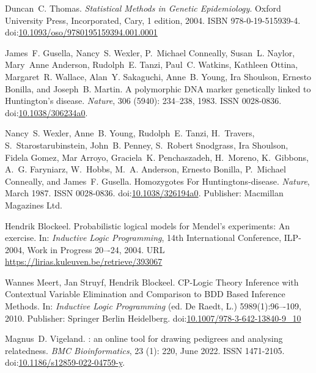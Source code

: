 \documentclass{eptcs}
\providecommand{\urlalt}[2]{\href{#1}{#2}}
\providecommand{\doi}[1]{doi:\urlalt{http://dx.doi.org/#1}{#1}}
\begin{document}
\begin{thebibliography}{}
Duncan~C. Thomas.
\newblock \emph{Statistical {Methods} in {Genetic} {Epidemiology}}.
\newblock Oxford University Press, Incorporated, Cary, 1 edition, 2004.
\newblock ISBN 978-0-19-515939-4.
\newblock \doi{10.1093/oso/9780195159394.001.0001}

James~F. Gusella, Nancy~S. Wexler, P.~Michael Conneally, Susan~L. Naylor, Mary~Anne Anderson, Rudolph~E. Tanzi, Paul~C. Watkins, Kathleen Ottina, Margaret~R. Wallace, Alan~Y. Sakaguchi, Anne~B. Young, Ira Shoulson, Ernesto Bonilla, and Joseph~B. Martin.
\newblock A polymorphic {DNA} marker genetically linked to {Huntington}'s disease.
\newblock \emph{Nature}, 306 (5940): 234--238, 1983.
\newblock ISSN 0028-0836.
\newblock \doi{10.1038/306234a0}.

Nancy~S. Wexler, Anne~B. Young, Rudolph~E. Tanzi, H.~Travers, S.~Starostarubinstein, John~B. Penney, S.~Robert Snodgrass, Ira Shoulson, Fidela Gomez, Mar Arroyo, Graciela~K. Penchaszadeh, H.~Moreno, K.~Gibbons, A.~G. Faryniarz, W.~Hobbs, M.~A. Anderson, Ernesto Bonilla, P.~Michael Conneally, and James~F. Gusella.
\newblock Homozygotes {For} {Huntingtons}-disease.
\newblock \emph{Nature}, March 1987.
\newblock ISSN 0028-0836.
\newblock \doi{10.1038/326194a0}.
\newblock Publisher: Macmillan Magazines Ltd.

Hendrik Blockeel. 
\newblock Probabilistic logical models for Mendel’s experiments: An exercise.
\newblock In: \textit{Inductive Logic Programming}, 14th International Conference, ILP-2004, Work in Progress 20–-24, 2004.
\newblock URL \url{https://lirias.kuleuven.be/retrieve/393067}

Wannes Meert, Jan Struyf, Hendrik Blockeel.
\newblock CP-Logic Theory Inference with Contextual Variable Elimination and Comparison to BDD Based Inference Methods. 
\newblock In: \textit{Inductive Logic Programming} (ed. De Raedt, L.) 5989(1):96–-109, 2010. 
\newblock Publisher: Springer Berlin Heidelberg.
\doi{10.1007/978-3-642-13840-9\_10}

Magnus~D. Vigeland.
: an online tool for drawing pedigrees and analysing relatedness.
\newblock \emph{BMC Bioinformatics}, 23 (1): 220, June 2022.
\newblock ISSN 1471-2105.
\newblock \doi{10.1186/s12859-022-04759-y}.


\end{thebibliography}
\end{document}
